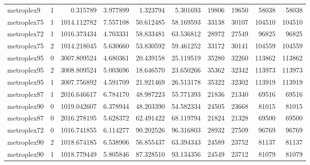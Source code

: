 \begin{longtable}{|l|r|r|r|r|r|r|r|r|r|}
metroplex9 & 1 & 0.315789 & 3.977899 & 1.323794 & 5.301693 & 19806 & 19650 & 58038 & 58038 \\
metroplex75 & 1 & 1014.112782 & 7.557108 & 50.612485 & 58.169593 & 33138 & 30107 & 104510 & 104510 \\
metroplex72 & 1 & 1016.373434 & 4.703331 & 58.833481 & 63.536812 & 28972 & 27549 & 96825 & 96825 \\
metroplex75 & 2 & 1014.218045 & 5.630660 & 53.830592 & 59.461252 & 33172 & 30141 & 104559 & 104559 \\
metroplex95 & 0 & 3007.809524 & 4.680361 & 20.439158 & 25.119519 & 35280 & 32260 & 113862 & 113862 \\
metroplex95 & 2 & 3008.809524 & 5.003696 & 18.646570 & 23.650266 & 35362 & 32342 & 113973 & 113973 \\
metroplex95 & 1 & 3007.756892 & 4.591709 & 21.921469 & 26.513178 & 35322 & 32302 & 113919 & 113919 \\
metroplex87 & 1 & 2016.646617 & 6.784170 & 48.987223 & 55.771393 & 21836 & 21340 & 69516 & 69516 \\
metroplex90 & 0 & 1019.042607 & 6.378944 & 48.203390 & 54.582334 & 24505 & 23668 & 81015 & 81015 \\
metroplex87 & 0 & 2016.278195 & 5.628372 & 62.491422 & 68.119794 & 21824 & 21328 & 69500 & 69500 \\
metroplex72 & 0 & 1016.741855 & 6.114277 & 90.202526 & 96.316803 & 28932 & 27509 & 96769 & 96769 \\
metroplex90 & 2 & 1018.674185 & 6.538906 & 56.855437 & 63.394343 & 24589 & 23752 & 81137 & 81137 \\
metroplex90 & 1 & 1018.779449 & 5.805846 & 87.328510 & 93.134356 & 24549 & 23712 & 81079 & 81079 \\
\end{longtable}
